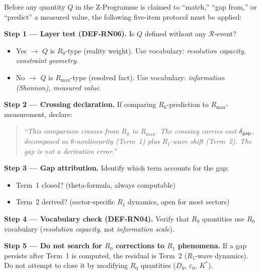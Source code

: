 \documentclass[12pt, a4paper]{article}
\begin{document}
\begin{formalbox}[title={DEF-ZC26-RS01: Resolution-Scale Protocol
  for Z-Programme}]
Before any quantity $Q$ in the Z-Programme is claimed to
``match,'' ``gap from,'' or ``predict'' a measured value,
the following five-item protocol must be applied:

\medskip
\textbf{Step 1 --- Layer test (DEF-RN06).}
Is $Q$ defined without any $\mathcal{R}$-event?
\begin{itemize}[leftmargin=*, noitemsep]
  \item Yes $\to$ $Q$ is $R_0$-type (reality weight).
    Use vocabulary: \emph{resolution capacity, constraint geometry}.
  \item No $\to$ $Q$ is $R_{\max}$-type (resolved fact).
    Use vocabulary: \emph{information (Shannon), measured value}.
\end{itemize}

\medskip
\textbf{Step 2 --- Crossing declaration.}
If comparing $R_0$-prediction to $R_{\max}$-measurement, declare:
\begin{quote}
\emph{``This comparison crosses from $R_0$ to $R_{\max}$.
The crossing carries cost $\delta_{\rm gap}$, decomposed
as $\theta$-nonlinearity (Term~1) plus $R_1$-wave shift (Term~2).
The gap is not a derivation error.''}
\end{quote}

\medskip
\textbf{Step 3 --- Gap attribution.}
Identify which term accounts for the gap:
\begin{itemize}[leftmargin=*, noitemsep]
  \item Term~1 closed? (theta-formula, always computable)
  \item Term~2 derived? (sector-specific $R_1$ dynamics, open
    for most sectors)
\end{itemize}

\medskip
\textbf{Step 4 --- Vocabulary check (DEF-RN04).}
Verify that $R_0$ quantities use $R_0$ vocabulary
(\emph{resolution capacity}, not \emph{information scale}).

\medskip
\textbf{Step 5 --- Do not search for $R_0$ corrections
to $R_1$ phenomena.}
If a gap persists after Term~1 is computed, the residual is
Term~2 ($R_1$-wave dynamics). Do not attempt to close it by
modifying $R_0$ quantities ($D_0$, $\varepsilon_0$, $K^*$).
\end{formalbox}
\end{document}
